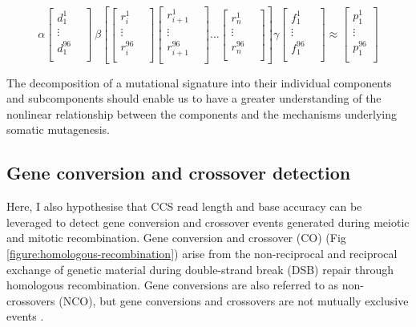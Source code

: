 \begin{equation} \label{eq:4}
\alpha \begin{bmatrix}
    d^{1}_{1}  \\
    \vdots &  \\
    d^{96}_{1}  \\
\end{bmatrix} \
\beta \left[\begin{bmatrix}
    r^{1}_{i} \\
    \vdots &  \\
    r^{96}_{i} \\
\end{bmatrix} 
\begin{bmatrix}
    r^{1}_{i+1} \\
    \vdots &  \\
    r^{96}_{i+1} \\
\end{bmatrix} \ldots 
\begin{bmatrix}
    r^{1}_{n} \\
    \vdots &  \\
    r^{96}_{n} \\
\end{bmatrix}\right]
\gamma \begin{bmatrix}
    f^{1}_{1}  \\
    \vdots &  \\
    f^{96}_{1}  \\
\end{bmatrix} \approx
\begin{bmatrix}
    p^{1}_{1} \\
    \vdots \\
    p^{96}_{1} \\
\end{bmatrix}
\end{equation}

The decomposition of a mutational signature into their individual components and subcomponents should enable us to have a greater understanding of the nonlinear relationship between the components and the mechanisms underlying somatic mutagenesis.

\subsection{Gene conversion and crossover detection}

Here, I also hypothesise that CCS read length and base accuracy can be leveraged to detect gene conversion and crossover events generated during meiotic and mitotic recombination. Gene conversion and crossover (CO) (Fig \ref{figure:homologous-recombination}) arise from the non-reciprocal and reciprocal exchange of genetic material during double-strand break (DSB) repair through homologous recombination. Gene conversions are also referred to as non-crossovers (NCO), but gene conversions and crossovers are not mutually exclusive events \cite{Hunter2015-gk}. 

